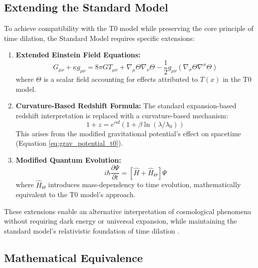 \documentclass[12pt,a4paper]{article}
\newcommand{\Tfield}{T(x)}
\begin{document}
	\subsection{Extending the Standard Model}
	\label{subsec:extending_standard_model}
	
	To achieve compatibility with the T0 model while preserving the core principle of time dilation, the Standard Model requires specific extensions:
	
	\begin{enumerate}
		\item \textbf{Extended Einstein Field Equations:}
		\begin{equation}
			G_{\mu\nu} + \kappa g_{\mu\nu} = 8\pi G T_{\mu\nu} + \nabla_{\mu}\Theta\nabla_{\nu}\Theta - \frac{1}{2}g_{\mu\nu}(\nabla_{\sigma}\Theta\nabla^{\sigma}\Theta)
			\label{eq:extended_einstein}
		\end{equation}
		where \(\Theta\) is a scalar field accounting for effects attributed to \(\Tfield\) in the T0 model.
		
		\item \textbf{Curvature-Based Redshift Formula:} The standard expansion-based redshift interpretation is replaced with a curvature-based mechanism:
		\begin{equation}
			1 + z = e^{\alpha d}(1 + \beta \ln(\lambda/\lambda_0))
			\label{eq:extended_redshift}
		\end{equation}
		This arises from the modified gravitational potential's effect on spacetime (Equation \ref{eq:grav_potential_t0}).
		
		\item \textbf{Modified Quantum Evolution:}
		\begin{equation}
			i\hbar\frac{\partial\Psi}{\partial t} = [\hat{H} + \hat{H}_{\Theta}]\Psi
			\label{eq:extended_schrodinger}
		\end{equation}
		where \(\hat{H}_{\Theta}\) introduces mass-dependency to time evolution, mathematically equivalent to the T0 model's approach.
	\end{enumerate}
	
	These extensions enable an alternative interpretation of cosmological phenomena without requiring dark energy or universal expansion, while maintaining the standard model's relativistic foundation of time dilation \cite{pascher_standardmod_2025}.
	
	\subsection{Mathematical Equivalence}
	\label{subsec:mathematical_equivalence}
	
\end{document}
